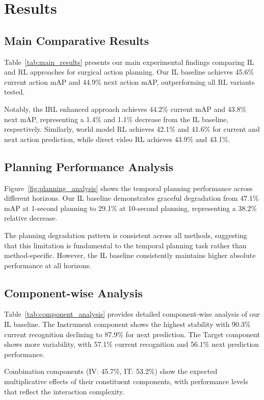 
\section{Results}

\subsection{Main Comparative Results}

Table~\ref{tab:main_results} presents our main experimental findings comparing IL and RL approaches for surgical action planning. Our IL baseline achieves 45.6\% current action mAP and 44.9\% next action mAP, outperforming all RL variants tested.

Notably, the IRL enhanced approach achieves 44.2\% current mAP and 43.8\% next mAP, representing a 1.4\% and 1.1\% decrease from the IL baseline, respectively. Similarly, world model RL achieves 42.1\% and 41.6\% for current and next action prediction, while direct video RL achieves 43.9\% and 43.1\%.

\subsection{Planning Performance Analysis}

Figure~\ref{fig:planning_analysis} shows the temporal planning performance across different horizons. Our IL baseline demonstrates graceful degradation from 47.1\% mAP at 1-second planning to 29.1\% at 10-second planning, representing a 38.2\% relative decrease.

The planning degradation pattern is consistent across all methods, suggesting that this limitation is fundamental to the temporal planning task rather than method-specific. However, the IL baseline consistently maintains higher absolute performance at all horizons.

\subsection{Component-wise Analysis}

Table~\ref{tab:component_analysis} provides detailed component-wise analysis of our IL baseline. The Instrument component shows the highest stability with 90.3\% current recognition declining to 87.9\% for next prediction. The Target component shows more variability, with 57.1\% current recognition and 56.1\% next prediction performance.

Combination components (IV: 45.7\%, IT: 53.2\%) show the expected multiplicative effects of their constituent components, with performance levels that reflect the interaction complexity.

